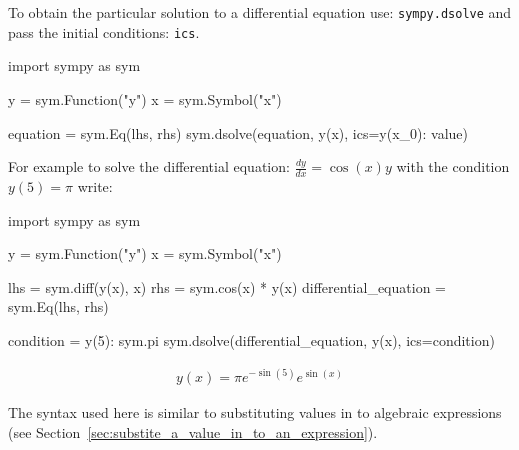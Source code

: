 To obtain the particular solution to a differential equation use:
\texttt{sympy.dsolve} and pass the initial conditions: \texttt{ics}.


\begin{api}
import sympy as sym

y = sym.Function("y")
x = sym.Symbol("x")

equation = sym.Eq(lhs, rhs)
sym.dsolve(equation, y(x), ics={y(x_0): value})
\end{api}



For example to solve the differential equation: \(\frac{dy}{dx} = \cos(x) y\)
with the condition \(y(5)= \pi\) 
write:




\begin{pyin}
import sympy as sym

y = sym.Function("y")
x = sym.Symbol("x")

lhs = sym.diff(y(x), x)
rhs = sym.cos(x) * y(x)
differential_equation = sym.Eq(lhs, rhs)

condition = {y(5): sym.pi}
sym.dsolve(differential_equation, y(x), ics=condition)
\end{pyin}




\begin{equation*}
\begin{split}\displaystyle y{\left(x \right)} = \pi e^{- \sin{\left(5 \right)}} e^{\sin{\left(x \right)}}\end{split}
\end{equation*}



\begin{note}
The syntax used here is similar to substituting values in to algebraic
expressions (see Section~\ref{sec:substite_a_value_in_to_an_expression}).
\end{note}





